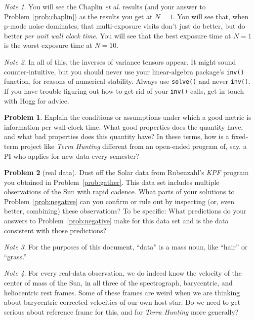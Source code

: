 \documentclass{article}
\theoremstyle{definition}
\newcommand{\problemname}{Problem}
\newtheorem{problem}{\problemname}
\newcommand{\probref}[1]{\problemname~\ref{#1}}
\theoremstyle{remark}
\newcommand{\notename}{Note}
\newtheorem{note}{\notename}[problem]
\begin{document}
\begin{note}
You will see the Chaplin \textsl{et al.} results (and your answer to \probref{prob:chaplin}) as the results you get at $N=1$.
You will see that, when p-mode noise dominates, that multi-exposure visits don't just do better, but do better \emph{per unit wall clock time}.
You will see that the best exposure time at $N=1$ is the worst exposure time at $N=10$.
\end{note}

\begin{note}\label{note:solve}
In all of this, the inverses of variance tensors appear.
It might sound counter-intuitive, but you should never use your linear-algebra package's \texttt{inv()} function, for reasons of numerical stability.
Always use \texttt{solve()} and never \texttt{inv()}.
If you have trouble figuring out how to get rid of your \texttt{inv()} calls, get in touch with Hogg for advice.
\end{note}

\begin{problem}
Explain the conditions or assumptions under which a good metric is information per wall-clock time.
What good properties does the quantity have, and what bad properties does this quantity have?
In these terms, how is a fixed-term project like \textsl{Terra Hunting} different from an open-ended program of, say, a PI who applies for new data every semester?
\end{problem}

\begin{problem}[real data]\label{prob:real}
Dust off the Solar data from Rubenzahl's \textsl{KPF} program you obtained in \probref{prob:gather}.
This data set includes multiple observations of the Sun with rapid cadence.
What parts of your solutions to \probref{prob:negative} can you confirm or rule out by inspecting (or, even better, combining) these observations?
To be specific:
What predictions do your answers to \probref{prob:negative} make for this data set and is the data consistent with those predictions?
\end{problem}

\begin{note}
For the purposes of this document, ``data'' is a mass noun, like ``hair'' or ``grass.''
\end{note}

\begin{note}
For every real-data observation, we do indeed know the velocity of the center of mass of the Sun, in all three of the spectrograph, barycentric, and heliocentric rest frames.
Some of these frames are weird when we are thinking about barycentric-corrected velocities of our own host star.
Do we need to get serious about reference frame for this, and for \textsl{Terra Hunting} more generally?
\end{note}
\end{document}
